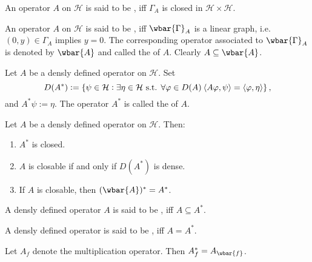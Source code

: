 \begin{definition}
	An operator $A$ on $\mathcal{H}$ is said to be , iff $\Gamma_A$ is closed in $\mathcal{H} \times \mathcal{H}$.
\end{definition}

\begin{definition}
	An operator $A$ on $\mathcal{H}$ is said to be , iff $\wbar{\Gamma}_A$ is a linear graph, i.e. $(0,y) \in \Gamma_A$ implies $y = 0$. The corresponding operator associated to $\wbar{\Gamma}_A$ is denoted by $\wbar{A}$ and called the  of $A$. Clearly $A \subseteq \wbar{A}$.
\end{definition}

\begin{definition}[Adjoint]
	Let $A$ be a densly defined operator on $\mathcal{H}$. Set
	\begin{equation*}
		D(A^*) := \cbr[0]{\psi \in \mathcal{H} : \exists \eta \in \mathcal{H} \text{ s.t. } \forall \varphi \in D(A) \>\langle A \varphi,\psi \rangle = \langle \varphi,\eta \rangle},
	\end{equation*}
	\noindent and $A^*\psi := \eta$. The operator $A^*$ is called the  of $A$.
\end{definition}

\begin{theorem}
	Let $A$ be a densly defined operator on $\mathcal{H}$. Then:
	\begin{enumerate}[label = \textup{(}\alph*\textup{)},wide=0pt]
		\item $A^*$ is closed.
		\item $A$ is closable if and only if $D(A^*)$ is dense.
		\item If $A$ is closable, then $(\wbar{A})^* = A^*$.
	\end{enumerate}
\end{theorem}

\begin{definition}
	A densly defined operator $A$ is said to be , iff $A \subseteq A^*$.
\end{definition}

\begin{definition}
	A densly defined operator is said to be , iff $A = A^*$.
\end{definition}

\begin{example}
	Let $A_f$ denote the multiplication operator. Then $A_f^* = A_{\wbar{f}}$.
\end{example}

